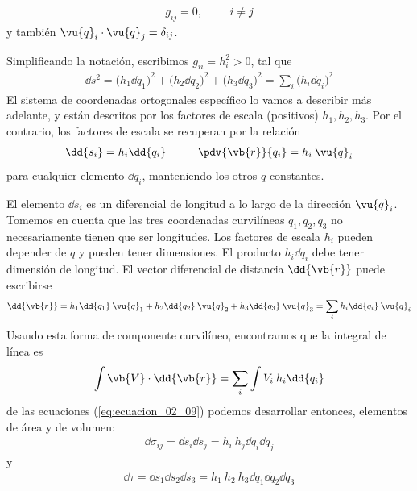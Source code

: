 \begin{align}
g_{ij} = 0, \hspace{1cm} i \neq j
\label{eq:ecuacion_02_07}
\end{align}
y también $\vu{q}_{i} \cdot \vu{q}_{j} = \delta_{ij}$.
\par
Simplificando la notación, escribimos $g_{ii} = h_{i}^{2} > 0$, tal que
\begin{align}
\dd{s^{2}} = (h_{1} \dd{q_{1})^{2}} + (h_{2} \dd{q_{2})^{2}} + (h_{3} \dd{q_{3})^{2}} = \sum_{i} (h_{i} \dd{q_{i})^{2}} 
\label{eq:ecuacion_02_08}
\end{align}
El sistema de coordenadas ortogonales específico lo vamos a describir más adelante, y están descritos por los factores de escala (positivos) $h_{1}, h_{2}, h_{3}$. Por el contrario, los factores de escala se recuperan por la relación
\begin{align}
\dd{s_{i}} = h_{i} \dd{q_{i}} \hspace{1cm} \pdv{\vb{r}}{q_{i}} = h_{i} \: \vu{q}_{i} 
\label{eq:ecuacion_02_09}
\end{align}
para cualquier elemento $\dd{q_{i}}$, manteniendo los otros $q$ constantes.
\par
El elemento $\dd{s_{i}}$ es un diferencial de longitud a lo largo de la dirección $\vu{q}_{i}$. Tomemos en cuenta que las tres coordenadas curvilíneas $q_{1}, q_{2}, q_{3}$ no necesariamente tienen que ser longitudes. Los factores de escala $h_{i}$ pueden depender de $q$ y pueden tener dimensiones. El producto $h_{i} \dd{q_{i}}$ debe tener dimensión de longitud. El vector diferencial de distancia $\dd{\vb{r}}$ puede escribirse
\begin{align*} 
\dd{\vb{r}} =  h_{1} \dd{q_{1}} \: \vu{q}_{1} + h_{2} \dd{q_{2}} \: \vu{q}_{2} + h_{3} \dd{q_{3}} \: \vu{q}_{3} = \sum_{i} h_{i} \dd{q_{i}} \: \vu{q}_{i}
\end{align*}
Usando esta forma de componente curvilíneo, encontramos que la integral de línea es
\begin{align*}
\int \vb{V} \cdot \dd{\vb{r}} = \sum_{i} \int V_{i} \: h_{i} \dd{q_{i}}
\end{align*}
de las ecuaciones (\ref{eq:ecuacion_02_09}) podemos desarrollar entonces, elementos de área y de volumen:
\begin{align}
\dd{\sigma_{ij}} = \dd{s_{i}} \dd{s_{j}} =  h_{i} \: h_{j} \dd{q_{i}} \dd{q_{j}}
\label{eq:ecuacion_02_10}
\end{align}
y
\begin{align}
\dd{\tau} = \dd{s_{1}} \dd{s_{2}} \dd{s_{3}} =  h_{1} \: h_{2} \: h_{3} \dd{q_{1}} \dd{q_{2}} \dd{q_{3}}
\label{eq:ecuacion_02_11}
\end{align}
